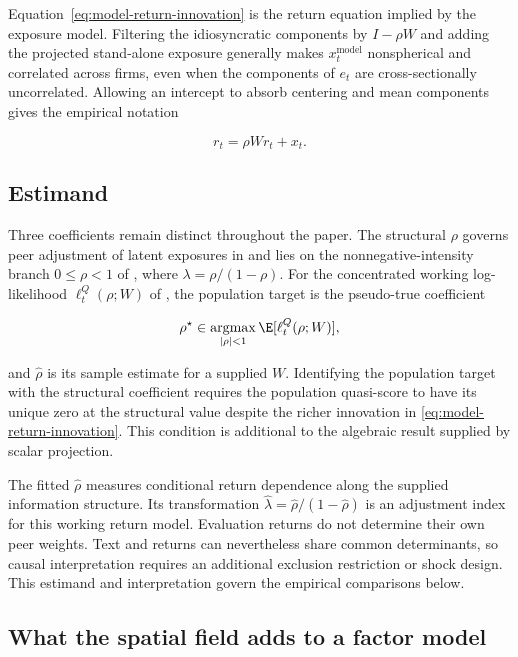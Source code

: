 Equation~\eqref{eq:model-return-innovation} is the return equation implied by
the exposure model.
Filtering the idiosyncratic components by $I-\rho W$ and adding the projected
stand-alone exposure generally makes $x_t^{\mathrm{model}}$ nonspherical and
correlated across firms, even when the components of $e_t$ are
cross-sectionally uncorrelated.
Allowing an intercept to absorb centering and mean components gives the
empirical notation

\begin{equation}\label{eq:spatial-lag}
  r_t = \rho W r_t + x_t .
\end{equation}

\subsection{Estimand}
\label{sec:estimand}

Three coefficients remain distinct throughout the paper.
The structural $\rho$ governs peer adjustment of latent exposures in
 and lies on the nonnegative-intensity branch $0\leq\rho<1$ of
, where $\lambda=\rho/(1-\rho)$.
For the concentrated working log-likelihood $\ell_t^Q(\rho;W)$ of
, the population target is the pseudo-true coefficient

\[
  \rho^\star
  \in\operatorname*{argmax}_{|\rho|<1}
  \E[\ell_t^Q(\rho;W)],
\]

and $\hat\rho$ is its sample estimate for a supplied $W$.
Identifying the population target with the structural coefficient requires the
population quasi-score to have its unique zero at the structural value despite
the richer innovation in \eqref{eq:model-return-innovation}.
This condition is additional to the algebraic result supplied by scalar
projection.

The fitted $\hat\rho$ measures conditional return dependence along the
supplied information structure.
Its transformation $\hat\lambda=\hat\rho/(1-\hat\rho)$ is an adjustment index
for this working return model.
Evaluation returns do not determine their own peer weights.
Text and returns can nevertheless share common determinants, so causal
interpretation requires an additional exclusion restriction or shock design.
This estimand and interpretation govern the empirical comparisons below.

\subsection{What the spatial field adds to a factor model}
\label{sec:factor-invariance}

